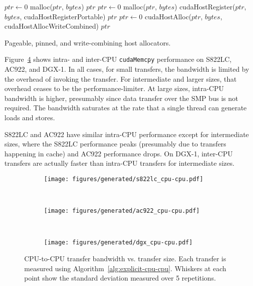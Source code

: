 \begin{algorithm}[H]
	\begin{algorithmic}[1]
		\Statex
		\State $ptr \gets 0$
		\State malloc($ptr$, $bytes$)
		\State \Return $ptr$
		\EndFunction
		\Statex
		\State $ptr \gets 0$
		\State malloc($ptr$, $bytes$)
		\State cudaHostRegister($ptr$, $bytes$, cudaHostRegisterPortable)
		\State \Return $ptr$
		\EndFunction
		\Statex
		\State $ptr \gets 0$
		\State cudaHostAlloc($ptr$, $bytes$, cudaHostAllocWriteCombined)
		\State \Return $ptr$
		\EndFunction
		
	\end{algorithmic}
	\caption[Pageable, pinned, and write-combining host allocators]{
        Pageable, pinned, and write-combining host allocators.
	}
	\label{alg:host-allocators}
\end{algorithm}

Figure~\ref{fig:explicit-cpu-cpu} shows intra- and inter-CPU \texttt{cudaMemcpy} performance on S822LC, AC922, and DGX-1.
In all cases, for small transfers, the bandwidth is limited by the overhead of invoking the transfer.
For intermediate and larger sizes, that overhead ceases to be the performance-limiter.
At large sizes, intra-CPU bandwidth is higher, presumably since data transfer over the SMP bus is not required.
The bandwidth saturates at the rate that a single thread can generate loads and stores.

S822LC and AC922 have similar intra-CPU performance except for intermediate sizes, where the S822LC performance peaks (presumably due to transfers happening in cache) and AC922 performance drops.
On DGX-1, inter-CPU transfers are actually faster than intra-CPU transfers for intermediate sizes.

\begin{figure}[H]
	\centering
	\begin{subfigure}[b]{0.31\textwidth}
		\texttt{[image: figures/generated/s822lc\_cpu-cpu.pdf]}
		\caption{}
		\label{fig:s822lc-cpu0-cpu1-dst}
	\end{subfigure}
	~
	\begin{subfigure}[b]{0.31\textwidth}
		\texttt{[image: figures/generated/ac922\_cpu-cpu.pdf]}
		\caption{}
		\label{fig:ac922-cpu0-cpu1-dst}
	\end{subfigure}
	~
	\begin{subfigure}[b]{0.31\textwidth}
		\texttt{[image: figures/generated/dgx\_cpu-cpu.pdf]}
		\caption{}
		\label{fig:dgx-cpu0-cpu1-dst}
	\end{subfigure}
	\caption[CPU-CPU transfer bandwidth]{
		CPU-to-CPU transfer bandwidth vs. transfer size.
		Each transfer is measured using Algorithm~\ref{alg:explicit-cpu-cpu}.
		Whiskers at each point show the standard deviation measured over 5 repetitions.
	}
	\label{fig:explicit-cpu-cpu}
\end{figure}

